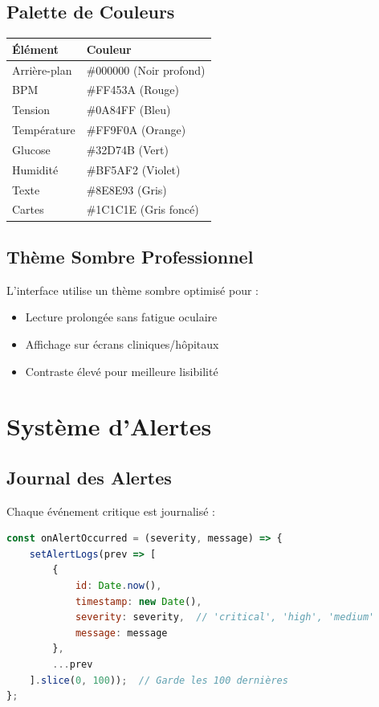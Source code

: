 \documentclass[12pt,french]{report}
\begin{document}
\subsection{Palette de Couleurs}

\begin{table}[h]
\centering
\begin{tabular}{|l|l|}
\hline
\textbf{Élément} & \textbf{Couleur} \\
\hline
Arrière-plan & \#000000 (Noir profond) \\
BPM & \#FF453A (Rouge) \\
Tension & \#0A84FF (Bleu) \\
Température & \#FF9F0A (Orange) \\
Glucose & \#32D74B (Vert) \\
Humidité & \#BF5AF2 (Violet) \\
Texte & \#8E8E93 (Gris) \\
Cartes & \#1C1C1E (Gris foncé) \\
\hline
\end{tabular}
\end{table}

\subsection{Thème Sombre Professionnel}

L'interface utilise un thème sombre optimisé pour :
\begin{itemize}
    \item Lecture prolongée sans fatigue oculaire
    \item Affichage sur écrans cliniques/hôpitaux
    \item Contraste élevé pour meilleure lisibilité
\end{itemize}

\section{Système d'Alertes}

\subsection{Journal des Alertes}

Chaque événement critique est journalisé :

\begin{lstlisting}[language=JavaScript]
const onAlertOccurred = (severity, message) => {
    setAlertLogs(prev => [
        {
            id: Date.now(),
            timestamp: new Date(),
            severity: severity,  // 'critical', 'high', 'medium'
            message: message
        },
        ...prev
    ].slice(0, 100));  // Garde les 100 dernières
};
\end{lstlisting}
\end{document}
